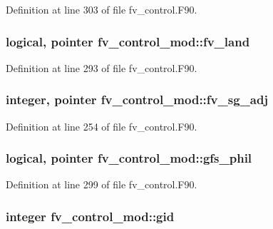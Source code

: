 Definition at line 303 of file fv\-\_\-control.\-F90.

\subsubsection[{fv\-\_\-land}]{\setlength{\rightskip}{0pt plus 5cm}logical, pointer fv\-\_\-control\-\_\-mod\-::fv\-\_\-land\hspace{0.3cm}{\ttfamily [private]}}\label{classfv__control__mod_af4c314c13b9fc726587ce6b016ea4e91}


Definition at line 293 of file fv\-\_\-control.\-F90.

\subsubsection[{fv\-\_\-sg\-\_\-adj}]{\setlength{\rightskip}{0pt plus 5cm}integer, pointer fv\-\_\-control\-\_\-mod\-::fv\-\_\-sg\-\_\-adj\hspace{0.3cm}{\ttfamily [private]}}\label{classfv__control__mod_a8a62e2737bfece356131347ab8bbc19c}


Definition at line 254 of file fv\-\_\-control.\-F90.

\subsubsection[{gfs\-\_\-phil}]{\setlength{\rightskip}{0pt plus 5cm}logical, pointer fv\-\_\-control\-\_\-mod\-::gfs\-\_\-phil\hspace{0.3cm}{\ttfamily [private]}}\label{classfv__control__mod_a23d51351494286e342a9ff3f808254f0}


Definition at line 299 of file fv\-\_\-control.\-F90.

\subsubsection[{gid}]{\setlength{\rightskip}{0pt plus 5cm}integer fv\-\_\-control\-\_\-mod\-::gid\hspace{0.3cm}{\ttfamily [private]}}\label{classfv__control__mod_a5604520a8bd260a859a6ec9dbaa60ad8}


